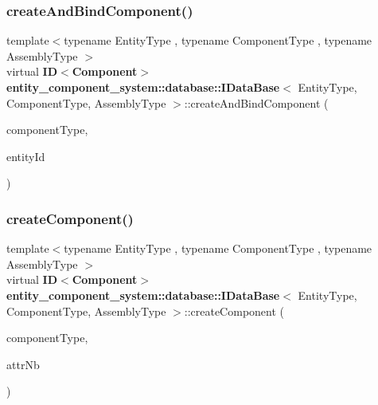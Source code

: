 \label{classentity__component__system_1_1database_1_1_i_data_base_ac3b147adcd7971a7925affabb81ee6bb} 
\subsubsection{create\+And\+Bind\+Component()}
{\footnotesize\ttfamily template$<$typename Entity\+Type , typename Component\+Type , typename Assembly\+Type $>$ \\
virtual {\bf ID}$<${\bf Component}$>$ {\bf entity\+\_\+component\+\_\+system\+::database\+::\+I\+Data\+Base}$<$ Entity\+Type, Component\+Type, Assembly\+Type $>$\+::create\+And\+Bind\+Component (\begin{DoxyParamCaption}\item[{Component\+Type const}]{component\+Type,  }\item[{{\bf ID}$<$ {\bf Entity} $>$ const \&}]{entity\+Id }\end{DoxyParamCaption})\hspace{0.3cm}{\ttfamily [pure virtual]}}

\label{classentity__component__system_1_1database_1_1_i_data_base_a7015be247d4bbc4497c6965c7f29af2a} 
\subsubsection{create\+Component()}
{\footnotesize\ttfamily template$<$typename Entity\+Type , typename Component\+Type , typename Assembly\+Type $>$ \\
virtual {\bf ID}$<${\bf Component}$>$ {\bf entity\+\_\+component\+\_\+system\+::database\+::\+I\+Data\+Base}$<$ Entity\+Type, Component\+Type, Assembly\+Type $>$\+::create\+Component (\begin{DoxyParamCaption}\item[{Component\+Type const}]{component\+Type,  }\item[{unsigned const}]{attr\+Nb }\end{DoxyParamCaption})\hspace{0.3cm}{\ttfamily [pure virtual]}}


